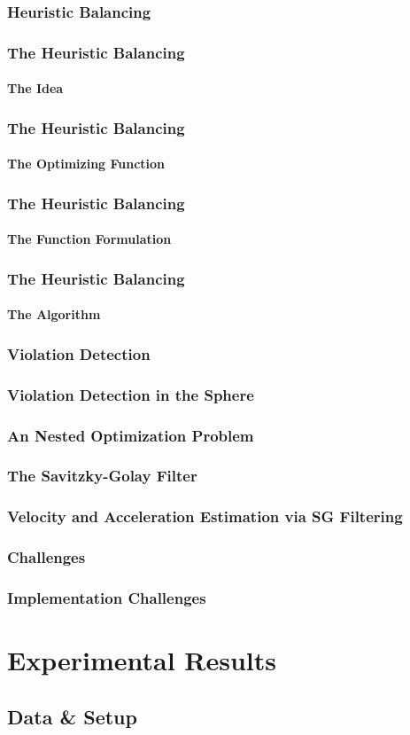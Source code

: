 \documentclass[hyperref={pdfpagelabels=false}]{beamer}
\begin{document}
\subsubsection*{Heuristic Balancing}
\begin{frame} \frametitle{The Heuristic Balancing}\framesubtitle{The Idea}

\end{frame}
\begin{frame} \frametitle{The Heuristic Balancing}\framesubtitle{The Optimizing Function}

\end{frame}
\begin{frame} \frametitle{The Heuristic Balancing}\framesubtitle{The Function Formulation}

\end{frame}
\begin{frame} \frametitle{The Heuristic Balancing}\framesubtitle{The Algorithm}

\end{frame}
\subsubsection*{Violation Detection}
\begin{frame} \frametitle{Violation Detection in the Sphere}\frametitle{An Nested Optimization Problem}

\end{frame}
\subsubsection*{The Savitzky-Golay Filter}
\begin{frame} \frametitle{Velocity and Acceleration Estimation via SG Filtering}

\end{frame}
\subsubsection*{Challenges}
\begin{frame} \frametitle{Implementation Challenges}

\end{frame}
\section{Experimental Results}
\subsection{Data \& Setup}
\end{document}
